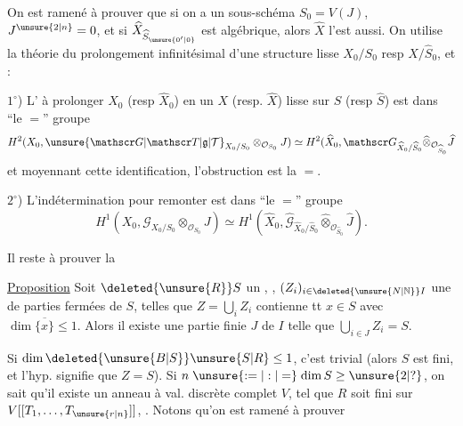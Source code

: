 
On est ramené à prouver que si  on a un sous-schéma $S_0=V(J)$, $J^{\unsure{2|n}}=0$, et si $\widehat X_{\widehat S_{\unsure{0'|0}}}$ est algébrique, alors $\widehat X$ l'est aussi. On utilise la théorie du prolongement infinitésimal d'une structure lisse $X_0/S_0$ resp $\widehat X/\widehat S_0$, et :

$1^\circ$) L' à prolonger $X_0$ (resp $\widehat X_0$) en un $X$ (resp. $\widehat X$) lisse sur $S$ (resp $\widehat S$) est dans ``le $=$'' groupe
\[
H^2(X_0,\unsure{\mathscr G|\mathscr T|\mathfrak g|\mathcal T}_{X_0/S_0}\otimes_{\mathcal O_{S_0}}J)\simeq H^2(\widehat X_0,\mathscr G_{\widehat X_0/\widehat S_0}\widehat\otimes_{\mathcal O_{\widehat S_0}}\widehat J
\]
et moyennant cette identification, l'obstruction est la $=$.

$2^\circ$) L'indétermination pour remonter est dans ``le $=$'' groupe
\[
H^1(X_0,\mathscr G_{X_0/S_0}\otimes_{\mathcal O_{S_0}}J)\simeq H^1(\widehat X_0,\widehat{\mathscr G}_{\widehat X_0/\widehat S_0}\widehat\otimes_{\mathcal O_{\widehat S_0}}\widehat J).
\]

Il reste à prouver la

\uline{Proposition} Soit $\deleted{\unsure{R}}S$ un  , , $(Z_i)_{i\in\deleted{\unsure{N|\mathbb N}}I}$ une   de parties fermées  de $S$, telles que $Z=\bigcup_i Z_i$ contienne tt $x\in S$ avec $\dim\overline{\{x\}}\leq1$. Alors il existe une partie finie $J$ de $I$ telle que $\bigcup_{i\in J} Z_i=S$.

 Si $\dim\deleted{\unsure{B|S}}\unsure{S|R}\leq1$, c'est trivial (alors  $S$ est fini, et l'hyp. signifie que $Z=S$). Si $n\mathrel{\unsure{:=|:|=}}\dim S\geq\unsure{2|?}$, on sait qu'il existe un anneau à val. discrète complet $V$,  tel que $R$ soit fini sur $V[[T_1,\ldots,T_{\unsure{r|n}}]]$, . Notons qu'on est ramené  à prouver
